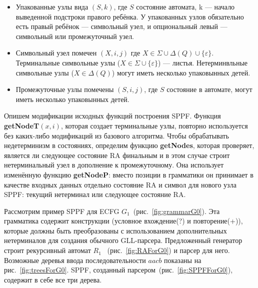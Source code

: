 \documentclass[12pt]{matmex-diploma-custom}
\begin{document}
	\begin{itemize}
		\item Упакованные узлы вида $(S, k)$, где $S$ состояние автомата, k --- начало выведенной
		подстроки правого ребёнка. У упакованных узлов обязательно есть правый ребёнок ---
		символьный узел, и опциональный левый --- символьный или промежуточный узел.
		\item Символьный узел помечен $(X, i, j)$ где $X \in \Sigma \cup \Delta(Q) \cup \{\varepsilon\}$.
		Терминальные символьные узлы ($X \in \Sigma \cup \{\varepsilon\}$) --- листья. 
		Нетерминвльные символьные узлы ($X \in \Delta(Q)$) могут иметь несколько упаковынных детей. 
		\item Промежуточные узлы помечены $ (S, i, j) $, где $S$ состояние в автомате, могут иметь несколько упаковынных детей.
	\end{itemize}
	
	Опишем модификации исходных функций построения SPPF.
	Функция \textbf{getNodeT$ (x, i) $}, которая создает терминальные узлы, 
	повторно используется без каких-либо модификаций из базового алгоритма.
	Чтобы обрабатывать недетерминизм в состояниях, определим функцию 
	\textbf{getNodes}, которая проверяет, является ли следующее состояние RA финальным
	и в этом случае строит нетерминальный узел в дополнение к промежуточному.
	Она использует изменённую функцию \textbf{getNodeP}: вместо позиции в грамматики он 
	принимает в качестве входных данных отдельно состояние RA и символ для нового узла SPPF:
	текущий нетерминал или следующее состояние RA.
	
	
	
	
	Рассмотрим пример SPPF для ECFG $ G_1 $~(рис.~\ref{fig:grammarG0}).
	Эта грамматика содержит конструкции (условное вхождение(?) и повторение(+)),
	которые должны быть преобразованы с использованием дополнительных нетерминалов 
	для создания обычного GLL-парсера.
	Предложенный генератор строит рекурсивный автомат $ R_1 $ ~(рис.~\ref{fig:RAForG0})
	и парсер для него. Возможные деревья ввода последовательности $ aacb $ показаны 
	на рис.~\ref{fig:treesForG0}. SPPF, созданный парсером~(рис.~\ref{fig:SPPFForG0}),
	содержит в себе все три дерева.
	
\end{document}
